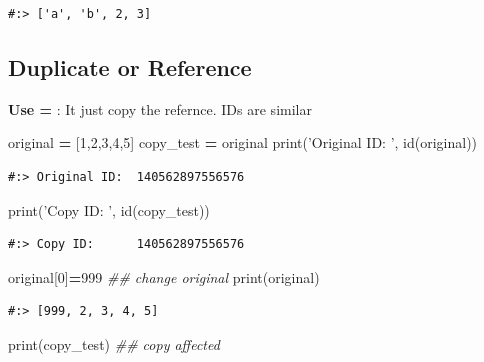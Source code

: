 \documentclass[
]{book}
\newenvironment{Shaded}{\begin{snugshade}}{\end{snugshade}}
\newcommand{\BuiltInTok}[1]{#1}
\newcommand{\CommentTok}[1]{\textcolor[rgb]{0.37,0.37,0.37}{\textit{#1}}}
\newcommand{\DecValTok}[1]{\textcolor[rgb]{0.06,0.06,0.06}{#1}}
\newcommand{\NormalTok}[1]{#1}
\newcommand{\OperatorTok}[1]{\textcolor[rgb]{0.43,0.43,0.43}{\textbf{#1}}}
\newcommand{\StringTok}[1]{\textcolor[rgb]{0.5,0.5,0.5}{#1}}
\begin{document}
\begin{verbatim}
#:> ['a', 'b', 2, 3]
\end{verbatim}

\hypertarget{duplicate-or-reference}{%
\subsection{Duplicate or Reference}\label{duplicate-or-reference}}

\textbf{Use =} : It just copy the refernce. IDs are similar

\begin{Shaded}
\begin{Highlighting}[]
\NormalTok{original }\OperatorTok{=}\NormalTok{ [}\DecValTok{1}\NormalTok{,}\DecValTok{2}\NormalTok{,}\DecValTok{3}\NormalTok{,}\DecValTok{4}\NormalTok{,}\DecValTok{5}\NormalTok{]}
\NormalTok{copy_test }\OperatorTok{=}\NormalTok{ original}
\BuiltInTok{print}\NormalTok{(}\StringTok{'Original ID: '}\NormalTok{, }\BuiltInTok{id}\NormalTok{(original))}
\end{Highlighting}
\end{Shaded}

\begin{verbatim}
#:> Original ID:  140562897556576
\end{verbatim}

\begin{Shaded}
\begin{Highlighting}[]
\BuiltInTok{print}\NormalTok{(}\StringTok{'Copy ID:     '}\NormalTok{, }\BuiltInTok{id}\NormalTok{(copy_test))                          }
\end{Highlighting}
\end{Shaded}

\begin{verbatim}
#:> Copy ID:      140562897556576
\end{verbatim}

\begin{Shaded}
\begin{Highlighting}[]
\NormalTok{original[}\DecValTok{0}\NormalTok{]}\OperatorTok{=}\DecValTok{999}   \CommentTok{## change original}
\BuiltInTok{print}\NormalTok{(original)}
\end{Highlighting}
\end{Shaded}

\begin{verbatim}
#:> [999, 2, 3, 4, 5]
\end{verbatim}

\begin{Shaded}
\begin{Highlighting}[]
\BuiltInTok{print}\NormalTok{(copy_test)  }\CommentTok{## copy affected}
\end{Highlighting}
\end{Shaded}
\end{document}
